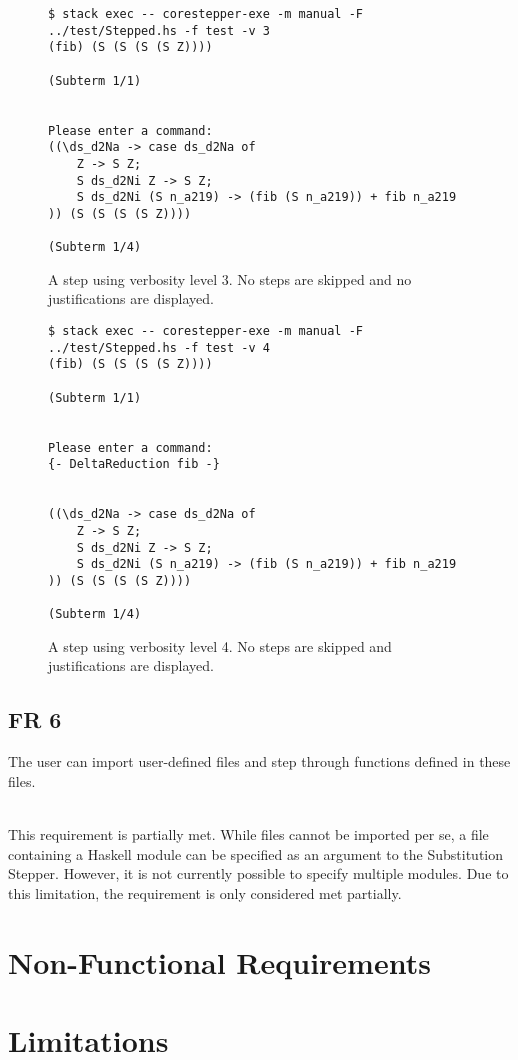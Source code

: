 \begin{figure}[!ht]
\begin{verbatim}
$ stack exec -- corestepper-exe -m manual -F ../test/Stepped.hs -f test -v 3
(fib) (S (S (S (S Z))))

(Subterm 1/1)


Please enter a command:
((\ds_d2Na -> case ds_d2Na of
    Z -> S Z;
    S ds_d2Ni Z -> S Z;
    S ds_d2Ni (S n_a219) -> (fib (S n_a219)) + fib n_a219
)) (S (S (S (S Z))))

(Subterm 1/4)
\end{verbatim}
    \caption{A step using verbosity level 3. No steps are skipped and no justifications are displayed.}
    \label{fig:FR5verbosit3}
\end{figure}

\begin{figure}[!ht]
\begin{verbatim}
$ stack exec -- corestepper-exe -m manual -F ../test/Stepped.hs -f test -v 4
(fib) (S (S (S (S Z))))

(Subterm 1/1)


Please enter a command:
{- DeltaReduction fib -}


((\ds_d2Na -> case ds_d2Na of
    Z -> S Z;
    S ds_d2Ni Z -> S Z;
    S ds_d2Ni (S n_a219) -> (fib (S n_a219)) + fib n_a219
)) (S (S (S (S Z))))

(Subterm 1/4)
\end{verbatim}
    \caption{A step using verbosity level 4. No steps are skipped and justifications are displayed.}
    \label{fig:FR5verbosit4}
\end{figure}


\clearpage
\subsection{FR 6}
The user can import user-defined files and step through functions defined in these files.

\ \\
This requirement is partially met.
While files cannot be imported per se, a file containing a Haskell module can be specified as an argument to the Substitution Stepper.
However, it is not currently possible to specify multiple modules.
Due to this limitation,
the requirement is only considered met partially.


\clearpage
\section{Non-Functional Requirements}

\section{Limitations}
